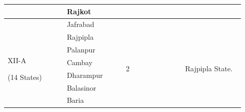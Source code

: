 \begin{longtable}{|p{0.23\linewidth}|p{0.23\linewidth}|p{0.23\linewidth}|p{0.23\linewidth}|}
 \\
\hline
 & Rajkot

 \\
\hline
 & Jafrabad

 \\
\hline
\multirow{13}{*}{XII-A













(14 States)











} & Rajpipla

 & \multirow{14}{*}{













2













} & \multirow{14}{*}{













Rajpipla State.













} \\
\hline
 & Palanpur

 \\
\hline
 & Cambay

 \\
\hline
 & Dharampur

 \\
\hline
 & Balasinor

 \\
\hline
 & Baria


\end{longtable}
